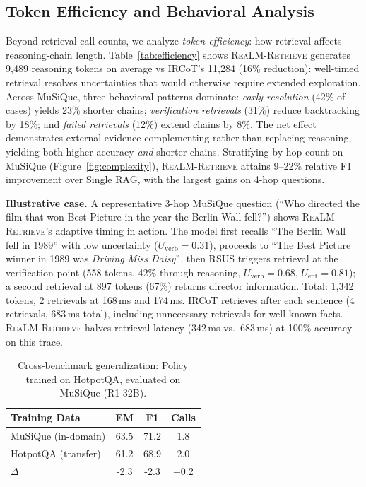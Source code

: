 \documentclass[sigconf,natbib=true]{acmart}
\newcommand{\methodname}{\textsc{ReaLM-Retrieve}}
\begin{document}
\subsection{Token Efficiency and Behavioral Analysis}
Beyond retrieval-call counts, we analyze \emph{token efficiency}: how retrieval affects reasoning-chain length. Table~\ref{tab:efficiency} shows \methodname{} generates 9{,}489 reasoning tokens on average vs IRCoT's 11{,}284 (16\% reduction): well-timed retrieval resolves uncertainties that would otherwise require extended exploration. Across MuSiQue, three behavioral patterns dominate: \emph{early resolution} (42\% of cases) yields 23\% shorter chains; \emph{verification retrievals} (31\%) reduce backtracking by 18\%; and \emph{failed retrievals} (12\%) extend chains by 8\%. The net effect demonstrates external evidence complementing rather than replacing reasoning, yielding both higher accuracy \emph{and} shorter chains. Stratifying by hop count on MuSiQue (Figure~\ref{fig:complexity}), \methodname{} attains 9--22\% relative F1 improvement over Single RAG, with the largest gains on 4-hop questions.

\textbf{Illustrative case.} A representative 3-hop MuSiQue question (``Who directed the film that won Best Picture in the year the Berlin Wall fell?'') shows \methodname{}'s adaptive timing in action. The model first recalls ``The Berlin Wall fell in 1989'' with low uncertainty ($U_{\text{verb}}=0.31$), proceeds to ``The Best Picture winner in 1989 was \emph{Driving Miss Daisy}'', then RSUS triggers retrieval at the verification point (558 tokens, 42\% through reasoning, $U_{\text{verb}}=0.68$, $U_{\text{ent}}=0.81$); a second retrieval at 897 tokens (67\%) returns director information. Total: 1{,}342 tokens, 2 retrievals at 168\,ms and 174\,ms. IRCoT retrieves after each sentence (4 retrievals, 683\,ms total), including unnecessary retrievals for well-known facts. \methodname{} halves retrieval latency (342\,ms vs.\ 683\,ms) at 100\% accuracy on this trace.

\begin{table}[t]
\small
\centering
\caption{Cross-benchmark generalization: Policy trained on HotpotQA, evaluated on MuSiQue (R1-32B).}
\label{tab:cross_benchmark}
\begin{tabular}{@{}l|ccc@{}}
\toprule
\textbf{Training Data} & \textbf{EM} & \textbf{F1} & \textbf{Calls} \\
\midrule
MuSiQue (in-domain) & 63.5 & 71.2 & 1.8 \\
HotpotQA (transfer) & 61.2 & 68.9 & 2.0 \\
\midrule
$\Delta$ & -2.3 & -2.3 & +0.2 \\
\bottomrule
\end{tabular}
\end{table}
\end{document}

